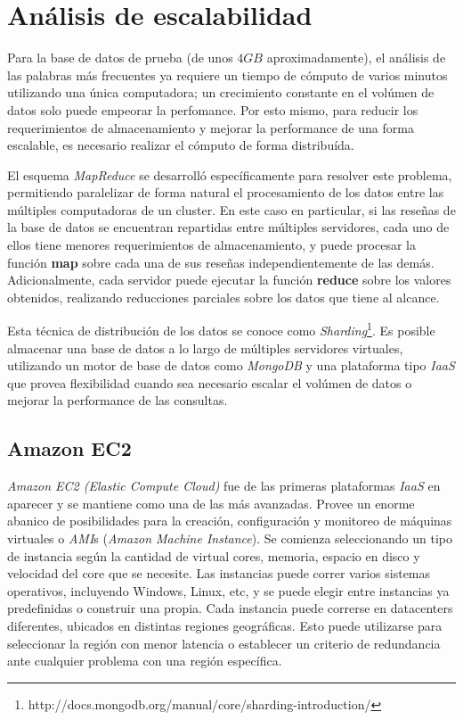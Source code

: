 \section{Análisis de escalabilidad}

Para la base de datos de prueba (de unos $4GB$ aproximadamente), el análisis de las palabras más frecuentes ya requiere un tiempo de cómputo de varios minutos utilizando una única computadora; un crecimiento constante en el volúmen de datos solo puede empeorar la perfomance. Por esto mismo, para reducir los requerimientos de almacenamiento y mejorar la performance de una forma escalable, es necesario realizar el cómputo de forma distribuída.

El esquema \emph{MapReduce} se desarrolló específicamente para resolver este problema, permitiendo paralelizar de forma natural el procesamiento de los datos entre las múltiples computadoras de un cluster. En este caso en particular, si las reseñas de la base de datos se encuentran repartidas entre múltiples servidores, cada uno de ellos tiene menores requerimientos de almacenamiento, y puede procesar la función \textbf{map} sobre cada una de sus reseñas independientemente de las demás. Adicionalmente, cada servidor puede ejecutar la función \textbf{reduce} sobre los valores obtenidos, realizando reducciones parciales sobre los datos que tiene al alcance.

Esta técnica de distribución de los datos se conoce como \emph{Sharding}\footnote{http://docs.mongodb.org/manual/core/sharding-introduction/}. Es posible almacenar una base de datos a lo largo de múltiples servidores virtuales, utilizando un motor de base de datos como \emph{MongoDB} y una plataforma tipo \emph{IaaS} que provea flexibilidad cuando sea necesario escalar el volúmen de datos o mejorar la performance de las consultas.

\subsection{Amazon EC2}

\emph{Amazon EC2 (Elastic Compute Cloud)} fue de las primeras plataformas \emph{IaaS} en aparecer y se mantiene como una de las más avanzadas. Provee un enorme abanico de posibilidades para la creación, configuración y monitoreo de máquinas virtuales o \emph{AMI}s (\emph{Amazon Machine Instance}). Se comienza seleccionando un tipo de instancia según la cantidad de virtual cores, memoria, espacio en disco y velocidad del core que se necesite. Las instancias puede correr varios sistemas operativos, incluyendo Windows, Linux, etc, y se puede elegir entre instancias ya predefinidas o construir una propia. Cada instancia puede correrse en datacenters diferentes, ubicados en distintas regiones geográficas. Esto puede utilizarse para seleccionar la región con menor latencia o establecer un criterio de redundancia ante cualquier problema con una región específica.

